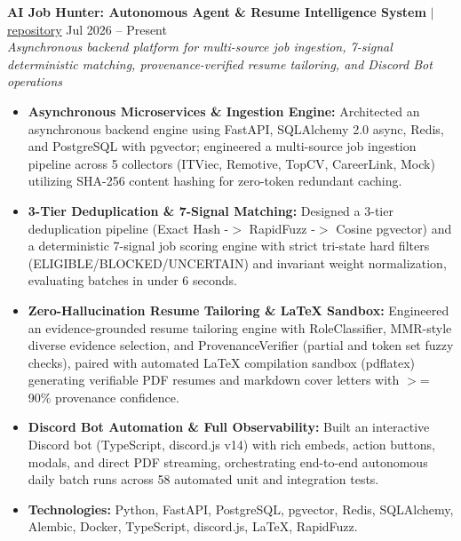 \documentclass[10pt,a4paper]{article}
\begin{document}
\noindent \textbf{AI Job Hunter: Autonomous Agent \& Resume Intelligence System} $|$ \href{https://github.com/vyquochuy/Discord-Job-hunt}{repository} \hfill Jul 2026 -- Present\\
\textit{Asynchronous backend platform for multi-source job ingestion, 7-signal deterministic matching, provenance-verified resume tailoring, and Discord Bot operations}
\begin{itemize}[leftmargin=0.25in, nosep]
    \item \textbf{Asynchronous Microservices \& Ingestion Engine:} Architected an asynchronous backend engine using FastAPI, SQLAlchemy 2.0 async, Redis, and PostgreSQL with pgvector; engineered a multi-source job ingestion pipeline across 5 collectors (ITViec, Remotive, TopCV, CareerLink, Mock) utilizing SHA-256 content hashing for zero-token redundant caching.
    \item \textbf{3-Tier Deduplication \& 7-Signal Matching:} Designed a 3-tier deduplication pipeline (Exact Hash -$>$ RapidFuzz -$>$ Cosine pgvector) and a deterministic 7-signal job scoring engine with strict tri-state hard filters (ELIGIBLE/BLOCKED/UNCERTAIN) and invariant weight normalization, evaluating batches in under 6 seconds.
    \item \textbf{Zero-Hallucination Resume Tailoring \& LaTeX Sandbox:} Engineered an evidence-grounded resume tailoring engine with RoleClassifier, MMR-style diverse evidence selection, and ProvenanceVerifier (partial and token set fuzzy checks), paired with automated LaTeX compilation sandbox (pdflatex) generating verifiable PDF resumes and markdown cover letters with $>$= 90\% provenance confidence.
    \item \textbf{Discord Bot Automation \& Full Observability:} Built an interactive Discord bot (TypeScript, discord.js v14) with rich embeds, action buttons, modals, and direct PDF streaming, orchestrating end-to-end autonomous daily batch runs across 58 automated unit and integration tests.
    \item \textbf{Technologies:} Python, FastAPI, PostgreSQL, pgvector, Redis, SQLAlchemy, Alembic, Docker, TypeScript, discord.js, LaTeX, RapidFuzz.
\end{itemize}
\vspace{10pt}
\end{document}
